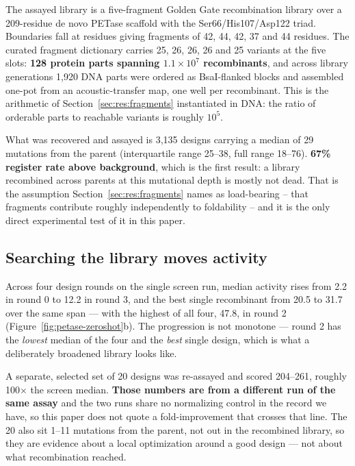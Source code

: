 The assayed library is a five-fragment Golden Gate recombination library over a
209-residue de novo PETase scaffold with the Ser66/His107/Asp122 triad.
Boundaries fall at residues giving fragments of 42, 44, 42, 37 and 44 residues.
The curated fragment dictionary carries 25, 26, 26, 26 and 25 variants at the
five slots: \textbf{128 protein parts spanning $1.1 \times 10^{7}$
recombinants}, and across library generations 1{,}920 DNA parts were ordered as
BsaI-flanked blocks and assembled one-pot from an acoustic-transfer map, one
well per recombinant. This is the arithmetic of Section~\ref{sec:res:fragments}
instantiated in DNA: the ratio of orderable parts to reachable variants is
roughly $10^{5}$.

What was recovered and assayed is 3{,}135 designs carrying a median of 29
mutations from the parent (interquartile range 25--38, full range 18--76).
\textbf{67\% register rate above background}, which is the first result: a
library recombined across parents at this mutational depth is mostly not dead.
That is the assumption Section~\ref{sec:res:fragments} names as load-bearing --
that fragments contribute roughly independently to foldability -- and it is the
only direct experimental test of it in this paper.

\subsection*{Searching the library moves activity}

Across four design rounds on the single screen run, median activity rises from
2.2 in round 0 to 12.2 in round 3, and the best single recombinant from 20.5 to
31.7 over the same span --- with the highest of all four, 47.8, in round 2
(Figure~\ref{fig:petase-zeroshot}b). The progression is not monotone --- round 2
has the \emph{lowest} median of the four and the \emph{best} single design,
which is what a deliberately broadened library looks like.

A separate, selected set of 20 designs was re-assayed and scored 204--261,
roughly 100$\times$ the screen median. \textbf{Those numbers are from a different
run of the same assay} and the two runs share no normalizing control in the
record we have, so this paper does not quote a fold-improvement that crosses
that line. The 20 also sit 1--11 mutations from the parent, not out in the
recombined library, so they are evidence about a local optimization around a
good design --- not about what recombination reached.

